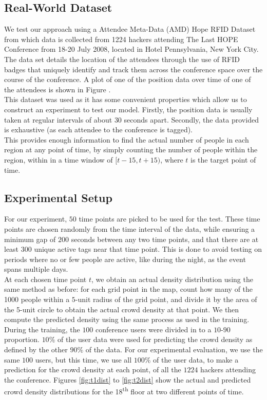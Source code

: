 \documentclass[letterpaper]{article}
\begin{document}
\subsection{Real-World Dataset}

We test our approach using a Attendee Meta-Data (AMD) Hope RFID Dataset from which data is collected from 1224 hackers attending The Last HOPE Conference from 18-20 July 2008, located in Hotel Pennsylvania, New York City.\\

The data set details the location of the attendees through the use of RFID badges that uniquely identify and track them across the conference space over the course of the conference. A plot of one of the position data over time of one of the attendees is shown in Figure .\\

This dataset was used as it has some convenient properties which allow us to construct an experiment to test our model. Firstly, the position data is usually taken at regular intervals of about $30$ seconds apart. Secondly, the data provided is exhaustive (as each attendee to the conference is tagged). \\

This provides enough information to find the actual number of people in each region at any point of time, by simply counting the number of people within the region, within in a time window of $[t-15,t+15)$, where $t$ is the target point of time.

\subsection{Experimental Setup}


For our experiment, $50$ time points are picked to be used for the test. These time points are chosen randomly from the time interval of the data, while ensuring a minimum gap of $200$ seconds between any two time points, and that there are at least $300$ unique active tags near that time point. This is done to avoid testing on periods where no or few people are active, like during the night, as the event spans multiple days.\\

At each chosen time point $t$, we obtain an actual density distribution using the same method as before: for each grid point in the map, count how many of the 1000 people within a $5$-unit radius of the grid point, and divide it by the area of the 5-unit circle to obtain the actual crowd density at that point. We then compute the predicted density using the same process as used in the training. During the training, the $100$ conference users were divided in to a $10$-$90$ proportion. $10\%$ of the user data were used for predicting the crowd density as defined by the other $90\%$ of the data. For our experimental evaluation, we use the same $100$ users, but this time, we use all $100\%$ of the user data, to make a prediction for the crowd density at each point, of all the $1224$ hackers attending the conference. Figures \ref{fig:t1dist} to \ref{fig:t2dist} show the actual and predicted crowd density distributions for the 18\textsuperscript{th} floor at two different points of time.\\
\end{document}
